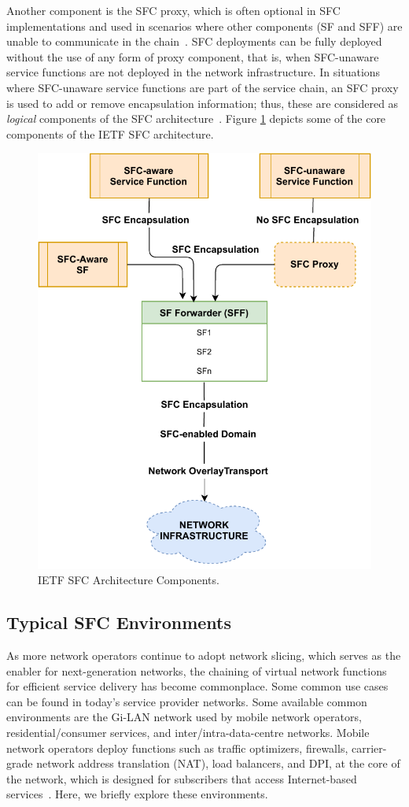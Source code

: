 \documentclass[futureinternet,review,accept,pdftex,moreauthors]{Definitions/mdpi}
\begin{document}
Another component is the SFC proxy, which is often optional in SFC implementations and used in scenarios where other components (SF and SFF) are unable to communicate in the chain~\cite{hantouti2020service}. SFC deployments can be fully deployed without the use of any form of proxy component, that is, when SFC-unaware service functions are not deployed in the network infrastructure. In situations where SFC-unaware service functions are part of the service chain, an SFC proxy is used to add or remove encapsulation information; thus, these are considered as {\textit{logical}} components of the SFC architecture~\cite{quinn2014service}. 
Figure \ref{SFC-Components-Figure} depicts some of the core components of the IETF SFC architecture.


\begin{figure}[H]%
\includegraphics[width=0.5\columnwidth]{SFC-COMPONENTS.pdf}
\caption{IETF SFC Architecture Components.}
\label{SFC-Components-Figure}
\end{figure}

\subsection{Typical SFC Environments}
\label{SFC-environments}
As more network operators continue to adopt network slicing, which serves as the enabler for next-generation networks, the chaining of virtual network functions for efficient service delivery has become commonplace. Some common use cases can be found in today's service provider networks. Some available common environments are the Gi-LAN network used by mobile network operators, residential/consumer services, and inter/intra-data-centre networks. Mobile network operators deploy functions such as traffic optimizers, firewalls, carrier-grade network address translation (NAT), load balancers, and DPI, at the core of the network, which is designed for subscribers that access Internet-based services~\cite{gronsund2015solution}. Here, we briefly explore these environments.
\end{document}
